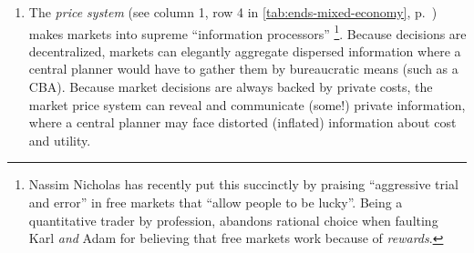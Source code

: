 \begin{enumerate}
	\item 
		The \emph{price system} (see column 1, row 4 in \autoref{tab:ends-mixed-economy}, p.~\pageref{tab:ends-mixed-economy}) makes markets into supreme ``information processors'' \citep{Hayek1931}
		\footnote{
			Nassim Nicholas \citeauthor{Taleb2007} has recently put this succinctly by praising ``aggressive trial and error'' \citeyearpar[xxi]{Taleb2007} in free markets that ``allow people to be lucky''. 
			Being a quantitative trader by profession, \citeauthor{Taleb2007} abandons rational choice when faulting Karl \citeauthor{Marx-1867-aa} \emph{and} Adam \citeauthor{Smith-1776-lq} for believing that free markets work because of \emph{rewards}.
		}. 
		Because decisions are decentralized, markets can elegantly aggregate dispersed information where a central planner would have to gather them by bureaucratic means (such as a \gls{CBA}). 
		Because market decisions are always backed by private costs, the market price system can reveal and communicate (some!) private information, where a central planner may face distorted (inflated) information about cost and utility.
\end{enumerate}

